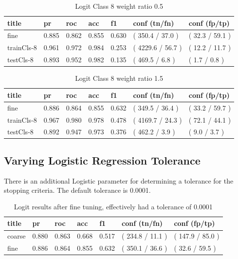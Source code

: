 \documentclass[ms]{nuthesis}
\begin{document}
\FloatBarrier
\begin{table}[H]
\centering
\caption{Logit Class 8 weight ratio 0.5}
\label{tab:LogRegCls8-Wtp5}
\begin{tabular}{|l||l||l||l||l||l||l|}\toprule
title & pr & roc & acc & f1 & conf (tn/fn) & conf (fp/tp) \\ \midrule
fine & 0.885 & 0.862 & 0.855 & 0.630 & ( 350.4 / 37.0 ) & ( 32.3 / 59.1 ) \\
trainCls-8 & 0.961 & 0.972 & 0.984 & 0.253 & ( 4229.6 / 56.7 ) & ( 12.2 / 11.7 ) \\
testCls-8 & 0.893 & 0.952 & 0.982 & 0.135 & ( 469.5 / 6.8 ) & ( 1.7 / 0.8 ) \\ \bottomrule
\end{tabular}
\end{table}
\FloatBarrier

\FloatBarrier
\begin{table}[H]
\centering
\caption{Logit Class 8 weight ratio 1.5}
\label{tab:LogRegCls8-Wt1p5}
\begin{tabular}{|l||l||l||l||l||l||l|}\toprule
title & pr & roc & acc & f1 & conf (tn/fn) & conf (fp/tp) \\ \midrule
fine & 0.886 & 0.864 & 0.855 & 0.632 & ( 349.5 / 36.4 ) & ( 33.2 / 59.7 ) \\
trainCls-8 & 0.967 & 0.980 & 0.978 & 0.478 & ( 4169.7 / 24.3 ) & ( 72.1 / 44.1 ) \\
testCls-8 & 0.892 & 0.947 & 0.973 & 0.376 & ( 462.2 / 3.9 ) & ( 9.0 / 3.7 ) \\ \bottomrule
\end{tabular}
\end{table}
\FloatBarrier

\subsection{Varying Logistic Regression Tolerance}
\par There is an additional Logistic parameter for determining a tolerance for the
stopping criteria. The default tolerance is 0.0001.

\FloatBarrier
\begin{table}[H]
\centering
\caption{Logit results after fine tuning, effectively had a tolerance of 0.0001}
\label{tab:LogRegAftFineTune}
\begin{tabular}{|l||l||l||l||l||l||l|}\toprule
title & pr & roc & acc & f1 & conf (tn/fn) & conf (fp/tp) \\ \midrule
coarse & 0.880 & 0.863 & 0.668 & 0.517 & ( 234.8 / 11.1 ) & ( 147.9 / 85.0 ) \\
fine & 0.886 & 0.864 & 0.855 & 0.632 & ( 350.1 / 36.6 ) & ( 32.6 / 59.5 ) \\ \bottomrule
\end{tabular}
\end{table}
\FloatBarrier
\end{document}
